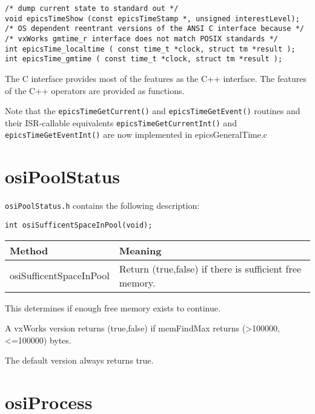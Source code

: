 \begin{verbatim}
/* dump current state to standard out */
void epicsTimeShow (const epicsTimeStamp *, unsigned interestLevel);
/* OS dependent reentrant versions of the ANSI C interface because */
/* vxWorks gmtime_r interface does not match POSIX standards */
int epicsTime_localtime ( const time_t *clock, struct tm *result );
int epicsTime_gmtime ( const time_t *clock, struct tm *result );

\end{verbatim}

The C interface provides most of the features as the C++ interface.
The features of the C++ operators are provided as functions.

Note that the \verb|epicsTimeGetCurrent()| and \verb|epicsTimeGetEvent()| routines and their ISR-callable equivalents \verb|epicsTimeGetCurrentInt()| and \verb|epicsTimeGetEventInt()| are now implemented in epicsGeneralTime.c

\section{osiPoolStatus}

\verb|osiPoolStatus.h| contains the following description:

\begin{verbatim}
int osiSufficentSpaceInPool(void);
\end{verbatim}

\begin{center}
\begin{longtable}{p{1.52778in}p{3.40278in}}
\textbf{Method} & \textbf{Meaning}\\
\hline
osiSufficentSpaceInPool & Return (true,false) if there is sufficient free memory.
\end{longtable}

\end{center}


This determines if enough free memory exists to continue.

A vxWorks version returns (true,false) if memFindMax returns (\textgreater{}100000, \textless{}=100000) bytes.

The default version always returns true.

\section{osiProcess}

